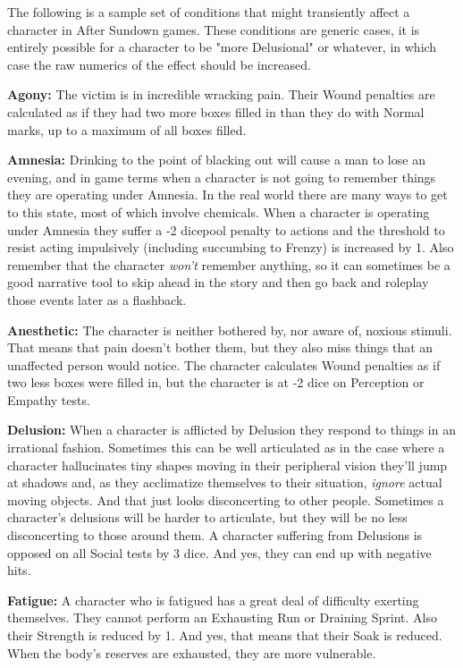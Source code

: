 The following is a sample set of conditions that might transiently affect a character in After Sundown games. These conditions are generic cases, it is entirely possible for a character to be "more Delusional" or whatever, in which case the raw numerics of the effect should be increased.

\textbf{Agony:} The victim is in incredible wracking pain. Their Wound penalties are calculated as if they had two more boxes filled in than they do with Normal marks, up to a maximum of all boxes filled.

\textbf{Amnesia:} Drinking to the point of blacking out will cause a man to lose an evening, and in game terms when a character is not going to remember things they are operating under Amnesia. In the real world there are many ways to get to this state, most of which involve chemicals. When a character is operating under Amnesia they suffer a -2 dicepool penalty to actions and the threshold to resist acting impulsively (including succumbing to Frenzy) is increased by 1. Also remember that the character \textit{won't} remember anything, so it can sometimes be a good narrative tool to skip ahead in the story and then go back and roleplay those events later as a flashback.

\textbf{Anesthetic:} The character is neither bothered by, nor aware of, noxious stimuli. That means that pain doesn't bother them, but they also miss things that an unaffected person would notice. The character calculates Wound penalties as if two less boxes were filled in, but the character is at -2 dice on Perception or Empathy tests.

\textbf{Delusion:} When a character is afflicted by Delusion they respond to things in an irrational fashion. Sometimes this can be well articulated as in the case where a character hallucinates tiny shapes moving in their peripheral vision they'll jump at shadows and, as they acclimatize themselves to their situation, \textit{ignore} actual moving objects. And that just looks disconcerting to other people. Sometimes a character's delusions will be harder to articulate, but they will be no less disconcerting to those around them. A character suffering from Delusions is opposed on all Social tests by 3 dice. And yes, they can end up with negative hits. 

\textbf{Fatigue:} A character who is fatigued has a great deal of difficulty exerting themselves. They cannot perform an Exhausting Run or Draining Sprint. Also their Strength is reduced by 1. And yes, that means that their Soak is reduced. When the body's reserves are exhausted, they are more vulnerable.

